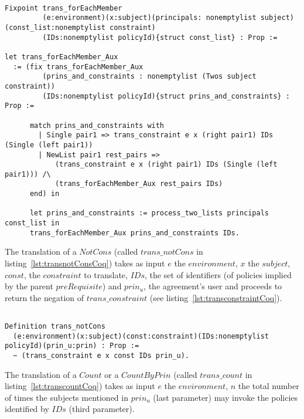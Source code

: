 \begin{minipage}[c]{0.95\textwidth}
\begin{lstlisting}

Fixpoint trans_forEachMember
         (e:environment)(x:subject)(principals: nonemptylist subject)(const_list:nonemptylist constraint)
         (IDs:nonemptylist policyId){struct const_list} : Prop := 

let trans_forEachMember_Aux   
  := (fix trans_forEachMember_Aux
         (prins_and_constraints : nonemptylist (Twos subject constraint))
         (IDs:nonemptylist policyId){struct prins_and_constraints} : Prop :=

      match prins_and_constraints with
        | Single pair1 => trans_constraint e x (right pair1) IDs (Single (left pair1)) 
        | NewList pair1 rest_pairs =>
            (trans_constraint e x (right pair1) IDs (Single (left pair1))) /\
            (trans_forEachMember_Aux rest_pairs IDs)
      end) in

      let prins_and_constraints := process_two_lists principals const_list in
      trans_forEachMember_Aux prins_and_constraints IDs.

\end{lstlisting}
\end{minipage}

The translation of a $NotCons$ (called $trans\_notCons$ in listing~\ref{lst:transnotConsCoq}) takes as input $e$ the $environment$, $x$ the $subject$, $const$, the $constraint$ to translate, $IDs$, the set of identifiers (of policies implied by the parent $preRequisite$) and $prin_{u}$, the agreement's user and proceeds to return the negation of $trans\_constraint$ (see listing~\ref{lst:transconstraintCoq}).


\begin{lstlisting}

Definition trans_notCons
  (e:environment)(x:subject)(const:constraint)(IDs:nonemptylist policyId)(prin_u:prin) : Prop :=
  ~ (trans_constraint e x const IDs prin_u).
\end{lstlisting}




The translation of a $Count$ or a $CountByPrin$ (called $trans\_count$ in listing~\ref{lst:transcountCoq}) takes as input $e$ the $environment$, $n$ the total number of times the subjects mentioned in $prin_{u}$ (last parameter) may invoke the policies identified by $IDs$ (third parameter).

